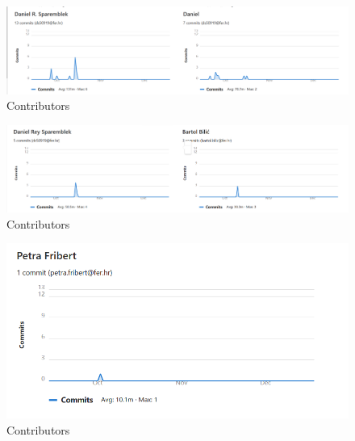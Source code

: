 		\begin{figure}[H]
			\includegraphics[width=\linewidth]{images/contribs_5.png}
			\caption{Contributors}
			\label{fig:contribs_5}
		\end{figure}

		\begin{figure}[H]
			\includegraphics[width=\linewidth]{images/contribs_6.png}
			\caption{Contributors}
			\label{fig:contribs_6}
		\end{figure}

		\begin{figure}[H]
			\includegraphics[width=\linewidth]{images/contribs_7.png}
			\caption{Contributors}
			\label{fig:contribs_7}
		\end{figure}
		
	